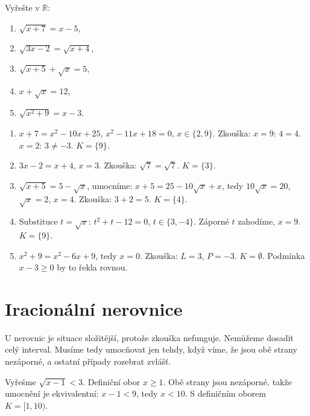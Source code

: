 \begin{problem}
  Vyřešte v $\mathbb{R}$:
  \begin{enumerate}[label=(\alph*)]
    \item $\sqrt{x + 7} = x - 5$,
    \item $\sqrt{3x - 2} = \sqrt{x + 4}$,
    \item $\sqrt{x + 5} + \sqrt{x} = 5$,
    \item $x + \sqrt{x} = 12$,
    \item $\sqrt{x^2 + 9} = x - 3$.
  \end{enumerate}
\end{problem}

\begin{solution}
  \begin{enumerate}[label=(\alph*)]
    \item $x + 7 = x^2 - 10x + 25$, $x^2 - 11x + 18 = 0$, $x\in\{2, 9\}$. Zkouška: $x = 9$: $4 = 4$. $x = 2$: $3\neq -3$. $K = \{9\}$.
    \item $3x - 2 = x + 4$, $x = 3$. Zkouška: $\sqrt{7} = \sqrt{7}$. $K = \{3\}$.
    \item $\sqrt{x + 5} = 5 - \sqrt{x}$, umocníme: $x + 5 = 25 - 10\sqrt{x} + x$, tedy $10\sqrt{x} = 20$, $\sqrt{x} = 2$, $x = 4$. Zkouška: $3 + 2 = 5$. $K = \{4\}$.
    \item Substituce $t = \sqrt{x}$: $t^2 + t - 12 = 0$, $t\in\{3, -4\}$. Záporné $t$ zahodíme, $x = 9$. $K = \{9\}$.
    \item $x^2 + 9 = x^2 - 6x + 9$, tedy $x = 0$. Zkouška: $L = 3$, $P = -3$. $K = \emptyset$. Podmínka $x - 3\geq 0$ by to řekla rovnou.
  \end{enumerate}
\end{solution}

\section{Iracionální nerovnice}\label{sec:iracionalni-nerovnice}

U nerovnic je situace složitější, protože zkouška nefunguje. Nemůžeme dosadit celý interval. Musíme tedy umocňovat jen tehdy, když víme, že jsou obě strany nezáporné, a ostatní případy rozebrat zvlášť.

\begin{example}
  Vyřešme $\sqrt{x - 1} < 3$. Definiční obor $x\geq 1$. Obě strany jsou nezáporné, takže umocnění je ekvivalentní: $x - 1 < 9$, tedy $x < 10$. S definičním oborem $K = [1, 10)$.
\end{example}


